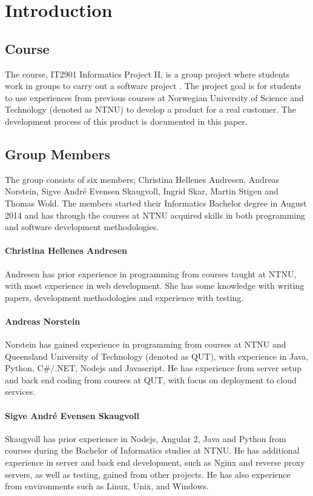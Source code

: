 
\chapter{Introduction}

\section{Course}
The course, IT2901 Informatics Project II, is a group project where students work in groups to carry out a software project \cite{EmneKode}. The project goal is for students to use experiences from previous courses at Norwegian University of Science and Technology (denoted as NTNU) to develop a product for a real customer. The development process of this product is documented in this paper.


\section{Group Members}
The group consists of six members; Christina Hellenes Andresen, Andreas Norstein, Sigve André Evensen Skaugvoll, Ingrid Skar, Martin Stigen and Thomas Wold. The members started their Informatics Bachelor degree in August 2014 and has through the courses at NTNU acquired skills in both programming and software development methodologies.

\subsubsection{Christina Hellenes Andresen}
\label{christina}
Andresen has prior experience in programming from courses taught at NTNU, with most experience in web development. She has some knowledge with writing papers, development methodologies and experience with testing.

\subsubsection{Andreas Norstein}
Norstein has gained experience in programming from courses at NTNU and Queensland University of Technology (denoted as QUT), with experience in Java, Python, C\#/.NET, Nodejs and Javascript. He has experience from server setup and back end coding from courses at QUT, with focus on deployment to cloud services. 

\subsubsection{Sigve André Evensen Skaugvoll}
\label{sigve}
Skaugvoll has prior experience in Nodejs, Angular 2, Java and Python from courses during the Bachelor of Informatics studies at NTNU. He has additional experience in server and back end development, such as Nginx and reverse proxy servers, as well as testing, gained from other projects. He has also experience from environments such as Linux, Unix, and Windows.

